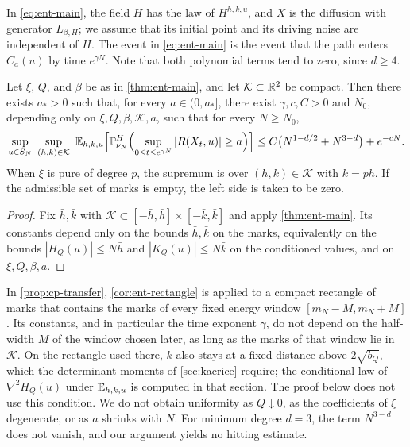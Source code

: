 In \eqref{eq:ent-main}, the field $H$ has the law of $H^{h,k,u}$, and $X$ is
the diffusion with generator $L_{\beta,H}$; we assume that its initial point
and its driving noise are independent of $H$. The event in
\eqref{eq:ent-main} is the event that the path enters $C_a(u)$ by time
$e^{\gamma N}$. Note that both
polynomial terms tend to zero, since $d\ge4$.

\begin{corollary}
\label{cor:ent-rectangle}
Let $\xi$, $Q$, and $\beta$ be as in \cref{thm:ent-main}, and let
$\mathcal K\subset\mathbb R^2$ be compact. Then there exists $a_*>0$ such that, for
every $a\in(0,a_*]$, there exist $\gamma,c,C>0$ and $N_0$, depending only on
$\xi,Q,\beta,\mathcal K,a$, such that for every $N\ge N_0$,
\begin{equation}\label{eq:ent-rectangle}
 \sup_{u\in S_N}\ \sup_{(h,k)\in\mathcal K}\
 \mathbb E_{h,k,u}\Bigl[\mathbb P^{H}_{\nu_N}\Bigl(\sup_{0\le t\le e^{\gamma N}}
   |R(X_t,u)|\ge a\Bigr)\Bigr]
 \le C\bigl(N^{1-d/2}+N^{3-d}\bigr)+e^{-cN}.
\end{equation}
When $\xi$ is pure of degree $p$, the supremum is over
$(h,k)\in\mathcal K$ with $k=ph$. If the admissible set of marks is empty,
the left side is taken to be zero.
\end{corollary}

\begin{proof}
Fix $\bar h,\bar k$ with $\mathcal K\subset[-\bar h,\bar h]\times
[-\bar k,\bar k]$ and apply \cref{thm:ent-main}. Its constants depend only
on the bounds $\bar h,\bar k$ on the marks, equivalently on the
bounds $|H_Q(u)|\le N\bar h$ and $|K_Q(u)|\le N\bar k$ on the conditioned
values, and on $\xi,Q,\beta,a$.
\end{proof}

\begin{remark}[Scope]\label{rem:ent-scope}
In \cref{prop:cp-transfer}, \cref{cor:ent-rectangle} is applied to a
compact rectangle of marks that contains the marks of every fixed
energy window $[m_N-M,m_N+M]$. Its constants, and in particular the time exponent $\gamma$,
do not depend on the half-width $M$ of the window chosen later, as long
as the marks of that window lie in $\mathcal K$. On the rectangle used there,
$k$ also stays at a fixed distance above $2\sqrt{b_Q}$, which the determinant moments of
\cref{sec:kacrice} require; the conditional law of $\nabla^2H_Q(u)$ under
$\mathbb E_{h,k,u}$ is computed in that section. The proof below does not use this
condition. We do not obtain uniformity as $Q\downarrow0$, as the coefficients of
$\xi$ degenerate, or as $a$ shrinks with $N$. For minimum degree $d=3$, the
term $N^{3-d}$ does not vanish, and our argument yields no hitting estimate.
\end{remark}

